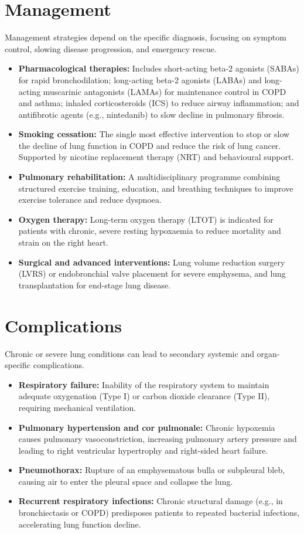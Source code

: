 \section*{Management}
Management strategies depend on the specific diagnosis, focusing on symptom control, slowing disease progression, and emergency rescue.
\begin{itemize}
    \item \textbf{Pharmacological therapies:} Includes short-acting beta-2 agonists (SABAs) for rapid bronchodilation; long-acting beta-2 agonists (LABAs) and long-acting muscarinic antagonists (LAMAs) for maintenance control in COPD and asthma; inhaled corticosteroids (ICS) to reduce airway inflammation; and antifibrotic agents (e.g., nintedanib) to slow decline in pulmonary fibrosis.
    \item \textbf{Smoking cessation:} The single most effective intervention to stop or slow the decline of lung function in COPD and reduce the risk of lung cancer. Supported by nicotine replacement therapy (NRT) and behavioural support.
    \item \textbf{Pulmonary rehabilitation:} A multidisciplinary programme combining structured exercise training, education, and breathing techniques to improve exercise tolerance and reduce dyspnoea.
    \item \textbf{Oxygen therapy:} Long-term oxygen therapy (LTOT) is indicated for patients with chronic, severe resting hypoxaemia to reduce mortality and strain on the right heart.
    \item \textbf{Surgical and advanced interventions:} Lung volume reduction surgery (LVRS) or endobronchial valve placement for severe emphysema, and lung transplantation for end-stage lung disease.
\end{itemize}

\section*{Complications}
Chronic or severe lung conditions can lead to secondary systemic and organ-specific complications.
\begin{itemize}
    \item \textbf{Respiratory failure:} Inability of the respiratory system to maintain adequate oxygenation (Type I) or carbon dioxide clearance (Type II), requiring mechanical ventilation.
    \item \textbf{Pulmonary hypertension and cor pulmonale:} Chronic hypoxemia causes pulmonary vasoconstriction, increasing pulmonary artery pressure and leading to right ventricular hypertrophy and right-sided heart failure.
    \item \textbf{Pneumothorax:} Rupture of an emphysematous bulla or subpleural bleb, causing air to enter the pleural space and collapse the lung.
    \item \textbf{Recurrent respiratory infections:} Chronic structural damage (e.g., in bronchiectasis or COPD) predisposes patients to repeated bacterial infections, accelerating lung function decline.
\end{itemize}

